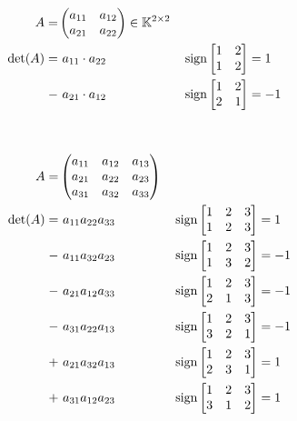 \begin{bsp}\
	\begin{description}[font=\normalfont]
		\item[$ n = 2 $:]\
		
			$ \begin{aligned}
				A =& \begin{pmatrix}
					a_{11} & a_{12} \\
					a_{21} & a_{22}
				\end{pmatrix}
				\in \mathbb K^{2 \times 2} \\
				\det(A) =&\ a_{11} \cdot a_{22} && \operatorname{sign}\begin{bmatrix} 1 & 2 \\ 1 & 2 \end{bmatrix} = 1 \\
				-&\ a_{21} \cdot a_{12} && \operatorname{sign}\begin{bmatrix}	1 & 2 \\ 2 & 1 \end{bmatrix} = -1
			\end{aligned} $
		\item[$ n = 3 $:]\
		
			$ \begin{aligned}
				A =& \begin{pmatrix}
					a_{11} & a_{12} & a_{13} \\
					a_{21} & a_{22} & a_{23} \\
					a_{31} & a_{32} & a_{33}
				\end{pmatrix} \\
				\det(A) =&\ a_{11}a_{22}a_{33} && \operatorname{sign}\begin{bmatrix} 1 & 2 & 3 \\ 1 & 2 & 3 \end{bmatrix} = 1 \\
				-&\ a_{11}a_{32}a_{23} && \operatorname{sign}\begin{bmatrix} 1 & 2 & 3 \\ 1 & 3 & 2 \end{bmatrix} = -1 \\
				-&\ a_{21}a_{12}a_{33} && \operatorname{sign}\begin{bmatrix} 1 & 2 & 3 \\ 2 & 1 & 3 \end{bmatrix} = -1 \\
				-&\ a_{31}a_{22}a_{13} && \operatorname{sign}\begin{bmatrix} 1 & 2 & 3 \\ 3 & 2 & 1 \end{bmatrix} = -1 \\
				+&\ a_{21}a_{32}a_{13} && \operatorname{sign}\begin{bmatrix} 1 & 2 & 3 \\ 2 & 3 & 1 \end{bmatrix} = 1 \\
				+&\ a_{31}a_{12}a_{23} && \operatorname{sign}\begin{bmatrix} 1 & 2 & 3 \\ 3 & 1 & 2 \end{bmatrix} = 1 \\
			\end{aligned} $
			

\end{description}
\end{bsp}
